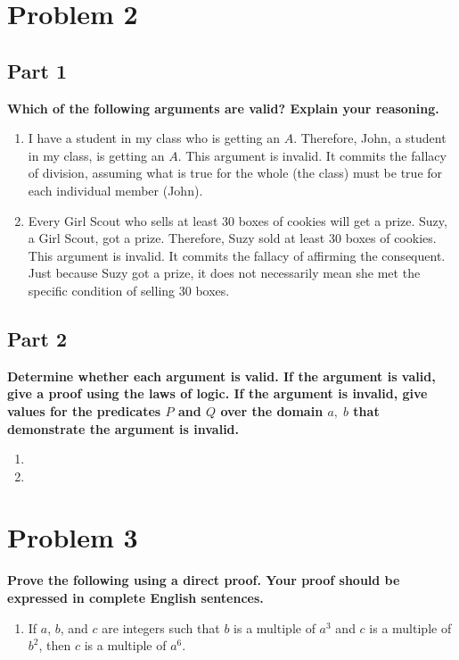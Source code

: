 \documentclass{amsart}
\theoremstyle{definition}
\theoremstyle{remark}
\numberwithin{equation}{section}
\begin{document}
\section*{Problem 2}
\subsection*{Part 1}
\textbf{Which of the following arguments are valid? Explain your reasoning.}
\begin{enumerate}[label=(\alph*)]
    \item I have a student in my class who is getting an $A$. Therefore, John, a student in my class, is getting an $A$.
    This argument is invalid. It commits the fallacy of division, assuming what is true for the whole (the class) must be true for each individual member (John).

    \item Every Girl Scout who sells at least 30 boxes of cookies will get a prize. Suzy, a Girl Scout, got a prize. Therefore, Suzy sold at least 30 boxes of cookies.
    This argument is invalid. It commits the fallacy of affirming the consequent. Just because Suzy got a prize, it does not necessarily mean she met the specific condition of selling 30 boxes.
\end{enumerate}

\subsection*{Part 2}
\textbf{Determine whether each argument is valid. If the argument is valid, give a proof using the laws of logic. If the argument is invalid, give values for the predicates $P$ and $Q$ over the domain ${a,\; b}$ that demonstrate the argument is invalid.}
\begin{enumerate}[label=(\alph*)]
    \item 
    \item 
\end{enumerate}


\section*{Problem 3}
\textbf{Prove the following using a direct proof. Your proof should be expressed in complete English sentences.}
\begin{enumerate}
    \item If $a$, $b$, and $c$ are integers such that $b$ is a multiple of $a^3$ and $c$ is a multiple of $b^2$, then $c$ is a multiple of $a^6$.
\end{enumerate}
\end{document}
